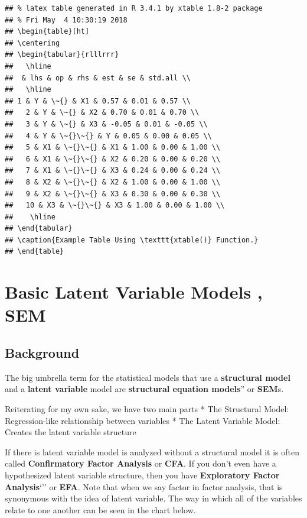 \documentclass[]{book}
\theoremstyle{definition}
\theoremstyle{definition}
\theoremstyle{definition}
\theoremstyle{remark}
\begin{document}
\begin{verbatim}
## % latex table generated in R 3.4.1 by xtable 1.8-2 package
## % Fri May  4 10:30:19 2018
## \begin{table}[ht]
## \centering
## \begin{tabular}{rlllrrr}
##   \hline
##  & lhs & op & rhs & est & se & std.all \\ 
##   \hline
## 1 & Y & \~{} & X1 & 0.57 & 0.01 & 0.57 \\ 
##   2 & Y & \~{} & X2 & 0.70 & 0.01 & 0.70 \\ 
##   3 & Y & \~{} & X3 & -0.05 & 0.01 & -0.05 \\ 
##   4 & Y & \~{}\~{} & Y & 0.05 & 0.00 & 0.05 \\ 
##   5 & X1 & \~{}\~{} & X1 & 1.00 & 0.00 & 1.00 \\ 
##   6 & X1 & \~{}\~{} & X2 & 0.20 & 0.00 & 0.20 \\ 
##   7 & X1 & \~{}\~{} & X3 & 0.24 & 0.00 & 0.24 \\ 
##   8 & X2 & \~{}\~{} & X2 & 1.00 & 0.00 & 1.00 \\ 
##   9 & X2 & \~{}\~{} & X3 & 0.30 & 0.00 & 0.30 \\ 
##   10 & X3 & \~{}\~{} & X3 & 1.00 & 0.00 & 1.00 \\ 
##    \hline
## \end{tabular}
## \caption{Example Table Using \texttt{xtable()} Function.} 
## \end{table}
\end{verbatim}

\section{Basic Latent Variable Models ,
SEM}\label{basic-latent-variable-models-sem}

\subsection{Background}\label{background-1}

The big umbrella term for the statistical models that use a
\textbf{structural model} and a \textbf{latent variable} model are
\textbf{structural equation models}'' or \textbf{SEM}s.

Reiterating for my own sake, we have two main parts * The Structural
Model: Regression-like relationship between variables * The Latent
Variable Model: Creates the latent variable structure

If there is latent variable model is analyzed without a structural model
it is often called \textbf{Confirmatory Factor Analysis} or
\textbf{CFA}. If you don't even have a hypothesized latent variable
structure, then you have \textbf{Exploratory Factor Analysis}`'' or
\textbf{EFA}. Note that when we say factor in factor analysis, that is
synonymous with the idea of latent variable. The way in which all of the
variables relate to one another can be seen in the chart below.
\end{document}

